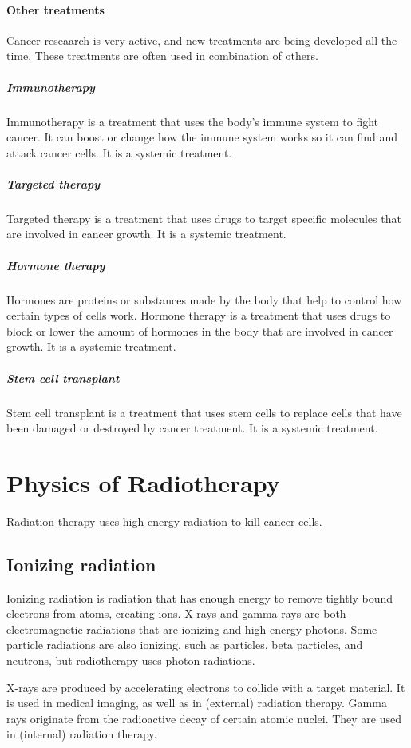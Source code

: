 \paragraph{Other treatments}
Cancer reseaarch is very active, and new treatments are being developed all the time.
These treatments are often used in combination of others.

\subparagraph{Immunotherapy}
Immunotherapy is a treatment that uses the body's immune system to fight cancer.
It can boost or change how the immune system works so it can find and attack cancer cells.
It is a systemic treatment.

\subparagraph{Targeted therapy}
Targeted therapy is a treatment that uses drugs to target specific molecules that are involved in cancer growth.
It is a systemic treatment.

\subparagraph{Hormone therapy}
Hormones are proteins or substances made by the body that help to control how certain types of cells work.
Hormone therapy is a treatment that uses drugs to block or lower the amount of hormones in the body that are involved in cancer growth.
It is a systemic treatment.

\subparagraph{Stem cell transplant}
Stem cell transplant is a treatment that uses stem cells to replace cells that have been damaged or destroyed by cancer treatment.
It is a systemic treatment.

\section{Physics of Radiotherapy}

Radiation therapy uses high-energy radiation to kill cancer cells.

\subsection{Ionizing radiation}
Ionizing radiation is radiation that has enough energy to remove tightly bound electrons from atoms, creating ions.
X-rays and gamma rays are both electromagnetic radiations that are ionizing and high-energy photons.
Some particle radiations are also ionizing, such as particles, beta particles, and neutrons, but radiotherapy uses photon radiations.

X-rays are produced by accelerating electrons to collide with a target material.
It is used in medical imaging, as well as in (external) radiation therapy.
Gamma rays originate from the radioactive decay of certain atomic nuclei.
They are used in (internal) radiation therapy.

